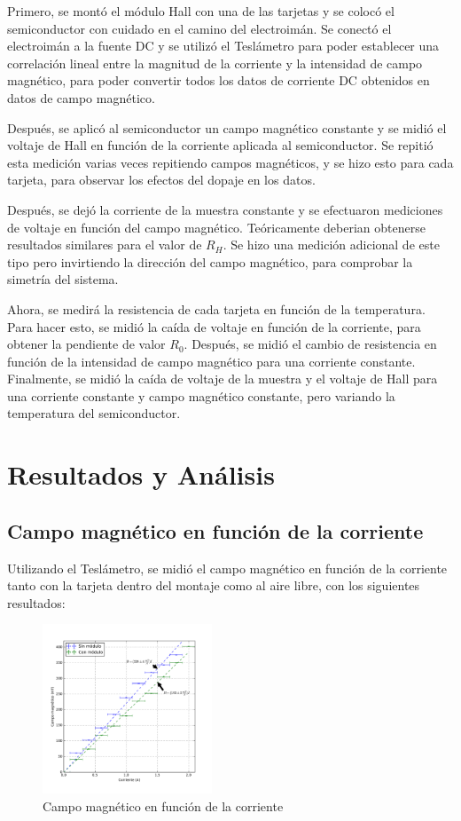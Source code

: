 \documentclass[twocolumn,showkeys,preprintnumbers,amsmath,amssymb]{revtex4}
\begin{document}
	Primero, se montó el módulo Hall con una de las tarjetas y se colocó el semiconductor con cuidado en el camino del electroimán. Se conectó el electroimán a la fuente DC y se utilizó el Teslámetro para poder establecer una correlación lineal entre la magnitud de la corriente y la intensidad de campo magnético, para poder convertir todos los datos de corriente DC obtenidos en datos de campo magnético.

	Después, se aplicó al semiconductor un campo magnético constante y se midió el voltaje de Hall en función de la corriente aplicada al semiconductor. Se repitió esta medición varias veces repitiendo campos magnéticos, y se hizo esto para cada tarjeta, para observar los efectos del dopaje en los datos.

	Después, se dejó la corriente de la muestra constante y se efectuaron mediciones de voltaje en función del campo magnético. Teóricamente deberian obtenerse resultados similares para el valor de $R_H$. Se hizo una medición adicional de este tipo pero invirtiendo la dirección del campo magnético, para comprobar la simetría del sistema.

	Ahora, se medirá la resistencia de cada tarjeta en función de la temperatura. Para hacer esto, se midió la caída de voltaje en función de la corriente, para obtener la pendiente de valor $R_0$. Después, se midió el cambio de resistencia en función de la intensidad de campo magnético para una corriente constante. Finalmente, se midió la caída de voltaje de la muestra y el voltaje de Hall para una corriente constante y campo magnético constante, pero variando la temperatura del semiconductor.
	


\section{\label{sec:resu} Resultados y Análisis}
	
	\subsection{Campo magnético en función de la corriente}
	
		Utilizando el Teslámetro, se midió el campo magnético en función de la corriente tanto con la tarjeta dentro del montaje como al aire libre, con los siguientes resultados:
		
		\begin{figure}[H]
			\centering
			\includegraphics[width=0.45\textwidth]{B.pdf}
			\caption{Campo magnético en función de la corriente}
			\label{tab:b}
		\end{figure}
		
\end{document}
